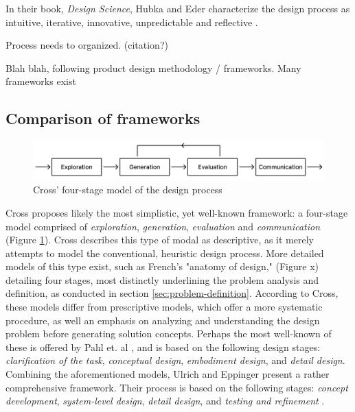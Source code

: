 In their book, \textit{Design Science}, Hubka and Eder characterize the design process as intuitive, iterative, innovative, unpredictable and reflective \cite{hubka_eder}.

Process needs to organized. (citation?)

Blah blah, following product design methodology / frameworks. Many frameworks exist

\subsection{Comparison of frameworks}
\vspace{2em}
\begin{figure}[H]
  \centering
  \includegraphics[width=14cm]{Pictures/Figures/cross.png}
  \caption{Cross' four-stage model of the design process}
  \label{fig:cross}
\end{figure}

Cross \cite{cross} proposes likely the most simplistic, yet well-known framework: a four-stage model comprised of \textit{exploration}, \textit{generation}, \textit{evaluation} and \textit{communication} (Figure \ref{fig:cross}). Cross describes this type of modal as descriptive, as it merely attempts to model the conventional, heuristic design process. More detailed models of this type exist, such as French's \cite{french} "anatomy of design," (Figure x) detailing four stages, most distinctly underlining the problem analysis and definition, as conducted in section \ref{sec:problem-definition}. According to Cross, these models differ from prescriptive models, which offer a more systematic procedure, as well an emphasis on analyzing and understanding the design problem before generating solution concepts. Perhaps the most well-known of these is offered by Pahl et. al \cite{pahl_beitz}, and is based on the following design stages: \textit{clarification of the task}, \textit{conceptual design}, \textit{embodiment design}, and \textit{detail design}. Combining the aforementioned models, Ulrich and Eppinger present a rather comprehensive framework. Their process is based on the following stages: \textit{concept development}, \textit{system-level design}, \textit{detail design}, and \textit{testing and refinement} \cite{ulrich_eppinger}.

